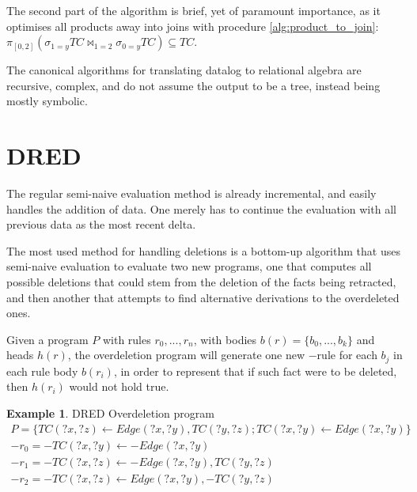 \documentclass[manuscript,screen,review]{acmart}
\theoremstyle{definition}
\newtheorem{exmp}{Example}[section]
\begin{document}
The second part of the algorithm is brief, yet of paramount importance, as it optimises all products away into joins with procedure \ref{alg:product_to_join}: $\pi_{[0, 2]}(\sigma_{1=y}TC \Join_{1=2} \sigma_{0=y}TC) \subseteq TC$.

The canonical algorithms for translating datalog to relational algebra\cite{opt_sys_alg_ev_dat, log_dab} are recursive, complex,
and do not assume the output to be a tree, instead being mostly symbolic.

\section{DRED}

The regular semi-naive evaluation method is already incremental, and easily handles the addition of data. One merely has to continue the evaluation with all previous data as the most recent delta.

The most used method for handling deletions is a bottom-up algorithm\cite{dred} that uses semi-naive evaluation to evaluate two new programs, one that computes all possible deletions that could stem from the deletion of the facts being retracted, and then another that attempts to find alternative derivations to the overdeleted ones.

Given a program $P$ with rules $r_0, ..., r_n$, with bodies $b(r) = \{b_0, ..., b_k\}$ and heads $h(r)$, the overdeletion program will generate one new $-$rule for each $b_j$ in each rule body $b(r_i)$, in order to represent that if such fact were to be deleted, then $h(r_i)$ would not hold true.

\begin{exmp}{DRED Overdeletion program}
	\begin{align}
		P = \{ TC(?x, ?z) \leftarrow Edge(?x, ?y), TC(?y, ?z); TC(?x, ?y) \leftarrow Edge(?x, ?y) \} \nonumber                                                \\
		-r_0 = -TC(?x, ?y) \leftarrow -Edge(?x, ?y)                                                                                                           \\
		-r_1 = -TC(?x, ?z) \leftarrow -Edge(?x, ?y), TC(?y, ?z)                                                                                     \nonumber \\
		-r_2 = -TC(?x, ?z) \leftarrow Edge(?x, ?y), -TC(?y, ?z)
	\end{align}
	\label{ex6}
\end{exmp}
\end{document}
